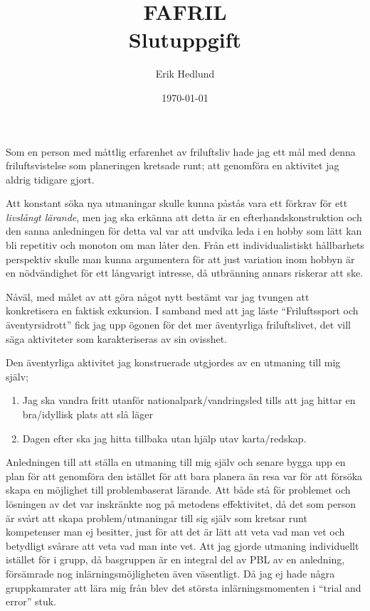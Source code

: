 \documentclass[12pt]{article}   %
\begin{document}
\onehalfspacing %

\title{%
    FAFRIL\\
    \smallskip
    \Large Slutuppgift
}   %
\author{Erik Hedlund}         %
\date{\today}    %
\maketitle

Som en person med måttlig erfarenhet av friluftsliv hade jag ett mål med denna
friluftsvistelse som planeringen kretsade runt; att genomföra en aktivitet
jag aldrig tidigare gjort.

Att konstant söka nya utmaningar skulle kunna påstås vara ett förkrav för
ett \textit{livslångt lärande}, %
men jag ska erkänna att detta är en efterhandskonstruktion och den sanna anledningen
för detta val var att undvika leda i en hobby som lätt kan bli repetitiv och monoton
om man låter den. Från ett individualistiskt hållbarhets perspektiv skulle man kunna
argumentera för att just variation inom hobbyn är en nödvändighet för ett långvarigt
intresse, då utbränning annars riskerar att ske.

Nåväl, med målet av att göra något nytt bestämt var jag tvungen att konkretisera
en faktisk exkursion. I samband med att jag läste ``Friluftssport och äventyrsidrott''
fick jag upp ögonen för det mer äventyrliga friluftslivet, det vill säga aktiviteter
som karakteriseras av sin ovisshet\cite{sandell2011friluftssport}.

Den äventyrliga aktivitet jag konstruerade utgjordes av en utmaning till mig själv;

\begin{enumerate}
        \item Jag ska vandra fritt utanför nationalpark/vandringsled tills att jag hittar en bra/idyllisk plats att slå läger
        \item Dagen efter ska jag hitta tillbaka utan hjälp utav karta/redskap.
\end{enumerate}

Anledningen till att ställa en utmaning till mig själv och senare bygga upp en plan
för att genomföra den istället för att bara planera än resa var för att försöka
skapa en möjlighet till problembaserat lärande. Att både stå för problemet och
lösningen av det var inskränkte nog på metodens effektivitet, då det som
person är svårt att skapa problem/utmaningar till sig själv som kretsar
runt kompetenser man ej besitter, just för att det är lätt att veta vad man vet
och betydligt svårare att veta vad man inte vet. Att jag gjorde utmaning individuellt
istället för i grupp, då basgruppen är en integral del av PBL\cite{silen2004} av en anledning,
försämrade nog inlärningsmöjligheten även väsentligt. Då jag ej hade några gruppkamrater
att lära mig från blev det största inlärningsmomenten i ``trial and error'' stuk.
\end{document}
